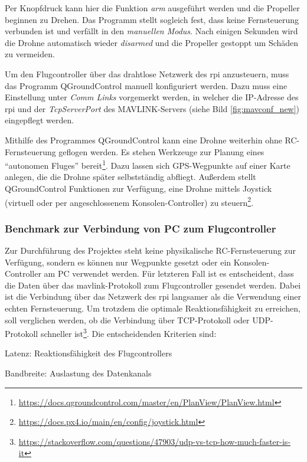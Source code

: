 Per Knopfdruck kann hier die Funktion \textit{arm} ausgeführt werden und die Propeller beginnen zu Drehen. Das Programm stellt sogleich fest, dass keine Fernsteuerung verbunden ist und verfällt in den \textit{manuellen Modus}. Nach einigen Sekunden wird die Drohne automatisch wieder \textit{disarmed} und die Propeller gestoppt um Schäden zu vermeiden.

Um den Flugcontroller über das drahtlose Netzwerk des \gls{rpi} anzusteuern, muss das Programm QGroundControl manuell konfiguriert werden. Dazu muss eine Einstellung unter \textit{Comm Links} vorgemerkt werden, in welcher die IP-Adresse des \gls{rpi} und der \textit{TcpServerPort} des MAVLINK-Servers (siehe Bild \ref{fig:mavconf_new}) eingepflegt werden.

Mithilfe des Programmes QGroundControl kann eine Drohne weiterhin ohne RC-Fernsteuerung geflogen werden. Es stehen Werkzeuge zur Planung eines \enquote{autonomen Fluges} bereit\footnote{\url{https://docs.qgroundcontrol.com/master/en/PlanView/PlanView.html}}. Dazu lassen sich GPS-Wegpunkte auf einer Karte anlegen, die die Drohne später selbstständig abfliegt. Außerdem stellt QGroundControl Funktionen zur Verfügung, eine Drohne mittels Joystick (virtuell oder per angeschlossenem Konsolen-Controller) zu steuern\footnote{\url{https://docs.px4.io/main/en/config/joystick.html}}.

\subsubsection{Benchmark zur Verbindung von PC zum Flugcontroller}\label{chap:bench_tcp_udp}
Zur Durchführung des Projektes steht keine physikalische RC-Fernsteuerung zur Verfügung, sondern es können nur Wegpunkte gesetzt oder ein Konsolen-Controller am PC verwendet werden. Für letzteren Fall ist es entscheident, dass die Daten über das mavlink-Protokoll zum Flugcontroller gesendet werden. Dabei ist die Verbindung über das Netzwerk des \gls{rpi} langsamer als die Verwendung einer echten Fernsteuerung. Um trotzdem die optimale Reaktionsfähigkeit zu erreichen, soll verglichen werden, ob die Verbindung über TCP-Protokoll oder UDP-Protokoll schneller ist\footnote{\url{https://stackoverflow.com/questions/47903/udp-vs-tcp-how-much-faster-is-it}}. Die entscheidenden Kriterien sind:
\begin{compactitem}
    \item Latenz: Reaktionsfähigkeit des Flugcontrollers
    \item Bandbreite: Auslastung des Datenkanals 
\end{compactitem}

